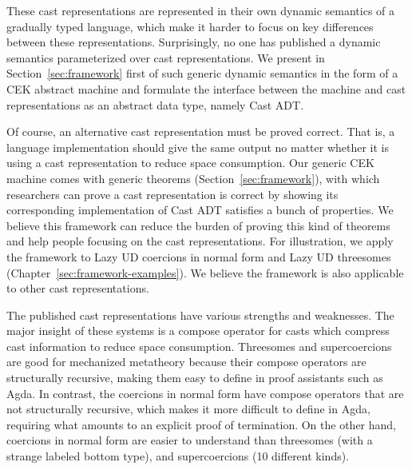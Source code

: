 \documentclass[runningheads]{llncs}
\begin{document}
These cast representations are represented in their own dynamic semantics of a gradually typed language,
which make it harder to focus on key differences between these representations. 
Surprisingly, no one has published a dynamic semantics parameterized over cast representations.
We present in Section~\ref{sec:framework} first of such generic dynamic semantics in the form 
of a CEK abstract machine and formulate the interface between the machine and cast representations
as an abstract data type, namely Cast ADT.

Of course, an alternative cast representation must be proved
correct. That is, a language implementation should give the same output no 
matter whether it is using a cast representation to reduce space 
consumption. Our generic CEK machine comes with generic theorems (Section~\ref{sec:framework}),
with which researchers can prove a cast representation is correct by showing its corresponding
implementation of Cast ADT satisfies a bunch of properties. We believe this framework can reduce the burden
 of proving this kind of theorems and help people focusing on the cast representations.
For illustration, we apply the framework to Lazy UD coercions in normal form
and Lazy UD threesomes (Chapter~\ref{sec:framework-examples}). 
We believe the framework is also applicable to other cast representations.

The published cast representations have various strengths and weaknesses.
The major insight of these systems is a compose operator for casts which compress cast information to
reduce space consumption.
Threesomes and supercoercions are good for mechanized
metatheory because their compose operators are structurally recursive,
making them easy to define in proof assistants such as Agda. In
contrast, the coercions in normal form have compose operators that are
not structurally recursive, which makes it more difficult to define in
Agda, requiring what amounts to an explicit proof of termination.
%
On the other hand, coercions in normal form are easier to understand
than threesomes (with a strange labeled bottom type), and
supercoercions (10 different kinds).
\end{document}

